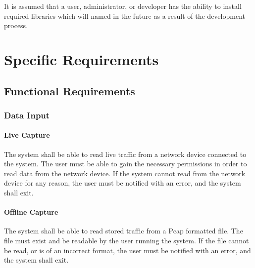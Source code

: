 \documentclass[titlepage]{article}
\begin{document}
It is assumed that a user, administrator, or developer has the ability to install required libraries which will named in the future as a result of the development process.


\section{Specific Requirements%
  \label{specific-requirements}%
}


\subsection{Functional Requirements%
    \label{functional}%
}


\subsubsection{Data Input} \label{data_input}

\paragraph{Live Capture}

The system shall be able to read live traffic from a network device connected
to the system.  The user must be able to gain the necessary permissions in
order to read data from the network device.  If the system cannot read from the
network device for any reason, the user must be notified with an error, and the
system shall exit.

\paragraph{Offline Capture}

The system shall be able to read stored traffic from a Pcap formatted file.
The file must exist and be readable by the user running the system.  If the
file cannot be read, or is of an incorrect format, the user must be notified
with an error, and the system shall exit.
\end{document}
